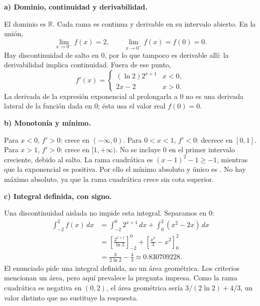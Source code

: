 \textbf{a) Dominio, continuidad y derivabilidad.}\par\nopagebreak[4]
El dominio es $\mathbb R$. Cada rama es continua y derivable en su intervalo abierto. En la unión,
\[
\lim_{x\to0^-}f(x)=2,\qquad
\lim_{x\to0^+}f(x)=f(0)=0.
\]
Hay discontinuidad de salto en $0$, por lo que tampoco es derivable allí: la derivabilidad implica continuidad. Fuera de ese punto,
\[
f'(x)=\begin{cases}(\ln2)2^{x+1}&x<0,\\2x-2&x>0.\end{cases}
\]
La derivada de la expresión exponencial al prolongarla a $0$ no es una derivada lateral de la función dada en $0$; ésta usa el valor real $f(0)=0$.

\textbf{b) Monotonía y mínimo.}\par\nopagebreak[4]
Para $x<0$, $f'>0$: crece en $(-\infty,0)$. Para $0<x<1$, $f'<0$: decrece en $[0,1]$. Para $x>1$, $f'>0$: crece en $[1,+\infty)$. No se incluye $0$ en el primer intervalo creciente, debido al salto.
La rama cuadrática es $(x-1)^2-1\geq-1$, mientras que la exponencial es positiva. Por ello el mínimo absoluto y único es . No hay máximo absoluto, ya que la rama cuadrática crece sin cota superior.

\textbf{c) Integral definida, con signo.}\par\nopagebreak[4]
Una discontinuidad aislada no impide esta integral. Separamos en $0$:
\[
\begin{aligned}
\int_{-2}^{2}f(x)\,dx
&=\int_{-2}^{0}2^{x+1}\,dx+\int_0^2(x^2-2x)\,dx\\
&=\left[\frac{2^{x+1}}{\ln2}\right]_{-2}^{0}
+\left[\frac{x^3}{3}-x^2\right]_0^2\\
&=\boxed{\frac{3}{2\ln2}-\frac43\approx0.830709228.}
\end{aligned}
\]
El enunciado pide una integral definida, no un área geométrica. Los criterios mencionan un área, pero aquí prevalece la pregunta impresa. Como la rama cuadrática es negativa en $(0,2)$, el área geométrica sería $3/(2\ln2)+4/3$, un valor distinto que no sustituye la respuesta.
